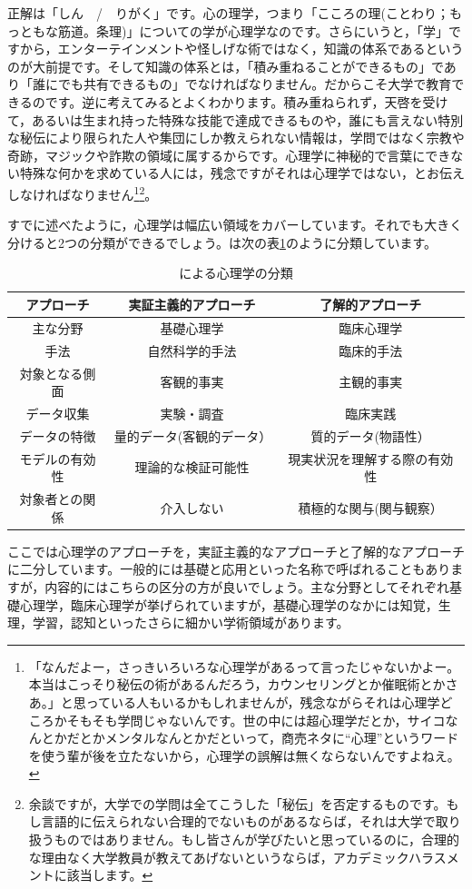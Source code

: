 \documentclass{book}
\begin{document}
正解は「しん　/　りがく」です。心の理学，つまり「こころの理(ことわり；もっともな筋道。条理)」についての学が心理学なのです。さらにいうと，「学」ですから，エンターテインメントや怪しげな術ではなく，知識の体系であるというのが大前提です。そして知識の体系とは，「積み重ねることができるもの」であり「誰にでも共有できるもの」でなければなりません。だからこそ大学で教育できるのです。逆に考えてみるとよくわかります。積み重ねられず，天啓を受けて，あるいは生まれ持った特殊な技能で達成できるものや，誰にも言えない特別な秘伝により限られた人や集団にしか教えられない情報は，学問ではなく宗教や奇跡，マジックや詐欺の領域に属するからです。心理学に神秘的で言葉にできない特殊な何かを求めている人には，残念ですがそれは心理学ではない，とお伝えしなければなりません\footnote{「なんだよー，さっきいろいろな心理学があるって言ったじゃないかよー。本当はこっそり秘伝の術があるんだろう，カウンセリングとか催眠術とかさあ。」と思っている人もいるかもしれませんが，残念ながらそれは心理学どころかそもそも学問じゃないんです。世の中には超心理学だとか，サイコなんとかだとかメンタルなんとかだといって，商売ネタに``心理''というワードを使う輩が後を立たないから，心理学の誤解は無くならないんですよねえ。}\footnote{余談ですが，大学での学問は全てこうした「秘伝」を否定するものです。もし言語的に伝えられない合理的でないものがあるならば，それは大学で取り扱うものではありません。もし皆さんが学びたいと思っているのに，合理的な理由なく大学教員が教えてあげないというならば，アカデミックハラスメントに該当します。}。

すでに述べたように，心理学は幅広い領域をカバーしています。それでも大きく分けると2つの分類ができるでしょう。\citet{下山2001}は次の表\ref{tbl01_01}のように分類しています。

\begin{table}[hb]
	\centering
	\caption{\citet{下山2001}による心理学の分類}
	\begin{tabular}{ccc}
		アプローチ     & 実証主義的アプローチ      & 了解的アプローチ             \\\hline\hline
		主な分野       & 基礎心理学                & 臨床心理学                   \\
		手法           & 自然科学的手法            & 臨床的手法                   \\
		対象となる側面 & 客観的事実                & 主観的事実                   \\
		データ収集     & 実験・調査                & 臨床実践                     \\
		データの特徴   & 量的データ(客観的データ） & 質的データ(物語性）          \\
		モデルの有効性 & 理論的な検証可能性        & 現実状況を理解する際の有効性 \\
		対象者との関係 & 介入しない                & 積極的な関与(関与観察）      \\\hline
	\end{tabular}
	\label{tbl01_01}
\end{table}
ここでは心理学のアプローチを，実証主義的なアプローチと了解的なアプローチに二分しています。一般的には基礎と応用といった名称で呼ばれることもありますが，内容的にはこちらの区分の方が良いでしょう。主な分野としてそれぞれ基礎心理学，臨床心理学が挙げられていますが，基礎心理学のなかには知覚，生理，学習，認知といったさらに細かい学術領域があります。
\end{document}
